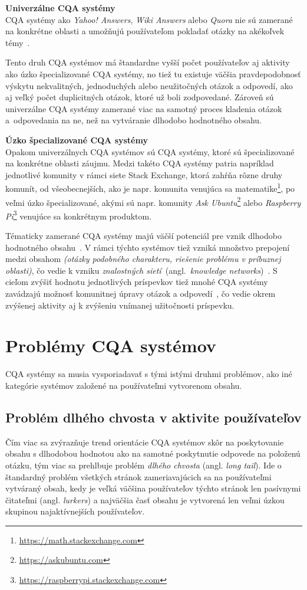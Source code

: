 \textbf{Univerzálne CQA systémy}\\
CQA systémy ako \emph{Yahoo! Answers}, \emph{Wiki Answers} alebo \emph{Quora} nie sú zamerané na konkrétne oblasti
a umožňujú používateľom pokladať otázky na akékoľvek témy~\cite{Chua2014}.

Tento druh CQA systémov má štandardne vyšší počet používateľov aj aktivity ako úzko špecializované CQA systémy,
no tiež tu existuje väčšia pravdepodobnosť výskytu nekvalitných, jednoduchých alebo neužitočných otázok a odpovedí,
ako aj veľký počet duplicitných otázok, ktoré už boli zodpovedané. Zároveň sú univerzálne CQA systémy zamerané viac
na samotný proces kladenia otázok a~odpovedania na ne, než na vytváranie dlhodobo hodnotného obsahu.

\textbf{Úzko špecializované CQA systémy}\\
Opakom univerzálnych CQA systémov sú CQA systémy, ktoré sú špecializované na konkrétne oblasti záujmu.
Medzi takéto CQA systémy patria napríklad jednotlivé komunity v rámci siete Stack Exchange, ktorá zahŕňa rôzne druhy
komunít, od všeobecnejších, ako je napr. komunita venujúca sa matematike\footnote{\url{https://math.stackexchange.com}},
po veľmi úzko špecializované, akými sú napr. komunity \emph{Ask Ubuntu}\footnote{\url{https://askubuntu.com}} alebo
\emph{Raspberry Pi}\footnote{\url{https://raspberrypi.stackexchange.com}} venujúce sa konkrétnym produktom.

Tématicky zamerané CQA systémy majú väčší potenciál pre vznik dlhodobo hodnotného obsahu~\cite{Anderson2012}. V rámci
týchto systémov tiež vzniká množstvo prepojení medzi obsahom \textit{(otázky podobného charakteru, riešenie problému
v príbuznej oblasti)}, čo vedie k vzniku \emph{znalostných sietí}~(angl.~\emph{knowledge networks})~\cite{Li2016}.
S cieľom zvýšiť hodnotu jednotlivých príspevkov tiež mnohé CQA systémy zavádzajú možnosť komunitnej úpravy
otázok a odpovedí~\cite{Li2015}, čo vedie okrem zvýšenej aktivity aj k zvýšeniu vnímanej užitočnosti príspevku.


\section{Problémy CQA systémov}

CQA systémy sa musia vysporiadavať s tými istými druhmi problémov, ako iné kategórie systémov založené na používateľmi
vytvorenom obsahu.

\subsection{Problém dlhého chvosta v aktivite používateľov}\label{cqa:tail}
Čím viac sa zvýrazňuje trend orientácie CQA systémov skôr na poskytovanie obsahu s dlhodobou hodnotou ako na samotné
poskytnutie odpovede na položenú otázku, tým viac sa prehlbuje problém \emph{dlhého chvosta} (angl. \emph{long tail}).
Ide o štandardný problém všetkých stránok zameriavajúcich sa na používateľmi vytváraný obsah, kedy je veľká väčšina
používateľov týchto stránok len pasívnymi čitateľmi (angl. \emph{lurkers}) a najväčšia časť obsahu je vytvorená len veľmi
úzkou skupinou najaktívnejších používateľov.

